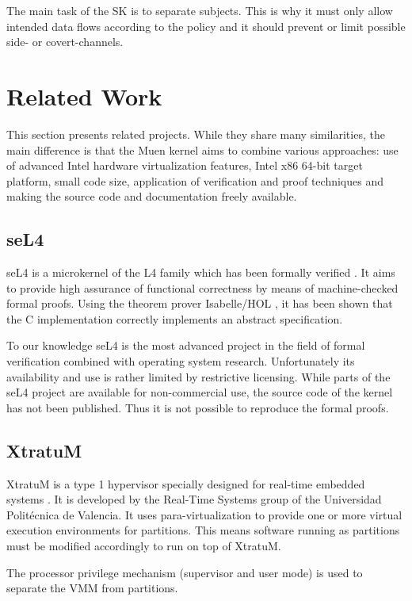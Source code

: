 The main task of the SK is to separate subjects. This is why it must only allow
intended data flows according to the policy and it should prevent or limit
possible side- or covert-channels.

\section{Related Work}
This section presents related projects. While they share many similarities, the
main difference is that the Muen kernel aims to combine various approaches: use
of advanced Intel hardware virtualization features, Intel x86 64-bit target
platform, small code size, application of verification and proof techniques and
making the source code and documentation freely available.

\subsection{seL4}
seL4 is a microkernel of the L4 \cite{Liedtke:1996:TRM:234215.234473} family
which has been formally verified \cite{Klein_EHACDEEKNSTW_09}. It aims to
provide high assurance of functional correctness by means of machine-checked
formal proofs. Using the theorem prover Isabelle/HOL
\cite{Nipkow-Paulson-Wenzel:2002}, it has been shown that the C implementation
correctly implements an abstract specification.

To our knowledge seL4 is the most advanced project in the field of formal
verification combined with operating system research. Unfortunately its
availability and use is rather limited by restrictive licensing. While parts of
the seL4 project are available for non-commercial use, the source code of the
kernel has not been published. Thus it is not possible to reproduce the formal
proofs.

\subsection{XtratuM}
XtratuM is a type 1 hypervisor specially designed for real-time embedded
systems \cite{xtratum:2009a}. It is developed by the Real-Time Systems group of
the Universidad Politécnica de Valencia. It uses para-virtualization to provide
one or more virtual execution environments for partitions. This means
software running as partitions must be modified accordingly to run on top of
XtratuM.

The processor privilege mechanism (supervisor and user mode) is used to
separate the VMM from partitions.

